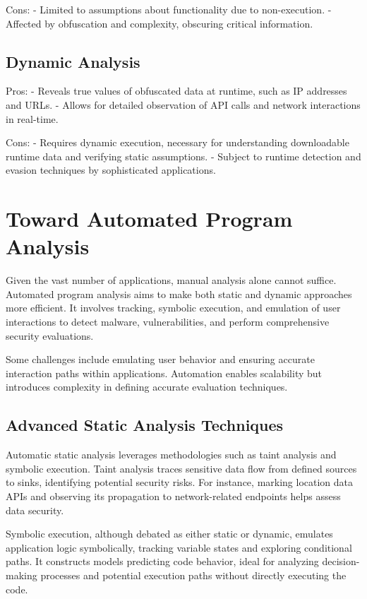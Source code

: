 \documentclass{article}
\begin{document}
Cons:
- Limited to assumptions about functionality due to non-execution.
- Affected by obfuscation and complexity, obscuring critical information.

\subsection*{Dynamic Analysis}
Pros:
- Reveals true values of obfuscated data at runtime, such as IP addresses and URLs.
- Allows for detailed observation of API calls and network interactions in real-time.

Cons:
- Requires dynamic execution, necessary for understanding downloadable runtime data and verifying static assumptions.
- Subject to runtime detection and evasion techniques by sophisticated applications.

\section*{Toward Automated Program Analysis}
Given the vast number of applications, manual analysis alone cannot suffice. Automated program analysis aims to make both static and dynamic approaches more efficient. It involves tracking, symbolic execution, and emulation of user interactions to detect malware, vulnerabilities, and perform comprehensive security evaluations.

Some challenges include emulating user behavior and ensuring accurate interaction paths within applications. Automation enables scalability but introduces complexity in defining accurate evaluation techniques.

\subsection*{Advanced Static Analysis Techniques}
Automatic static analysis leverages methodologies such as taint analysis and symbolic execution. Taint analysis traces sensitive data flow from defined sources to sinks, identifying potential security risks. For instance, marking location data APIs and observing its propagation to network-related endpoints helps assess data security.

Symbolic execution, although debated as either static or dynamic, emulates application logic symbolically, tracking variable states and exploring conditional paths. It constructs models predicting code behavior, ideal for analyzing decision-making processes and potential execution paths without directly executing the code.
\end{document}

